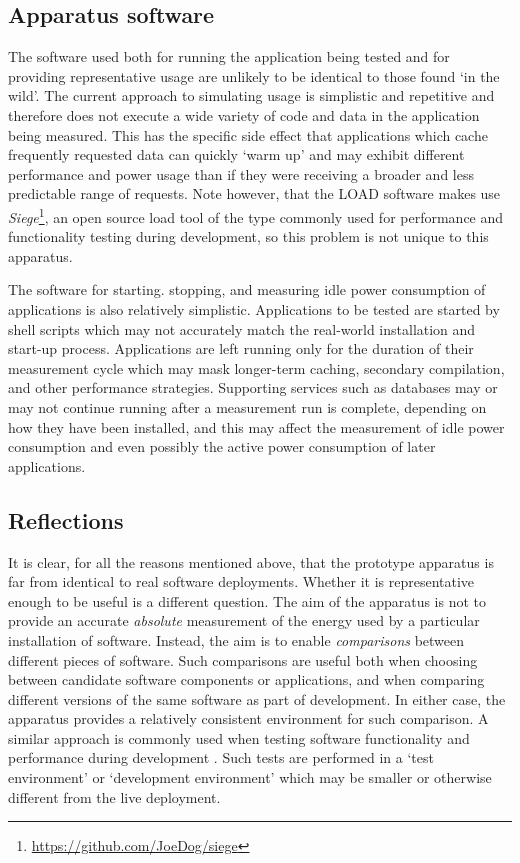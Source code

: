 \subsection{Apparatus software}

The software used both for running the application being tested and for providing representative usage are unlikely to be identical to those found `in the wild'. The current approach to simulating usage is simplistic and repetitive and therefore does not execute a wide variety of code and data in the application being measured. This has the specific side effect that applications which cache frequently requested data can quickly `warm up' and may exhibit different performance and power usage than if they were receiving a broader and less predictable range of requests. Note however, that the LOAD software makes use \emph{Siege}\footnote{\url{https://github.com/JoeDog/siege}}, an open source load tool of the type commonly used for performance and functionality testing during development, so this problem is not unique to this apparatus.

The software for starting. stopping, and measuring idle power consumption of applications is also relatively simplistic. Applications to be tested are started by shell scripts which may not accurately match the real-world installation and start-up process. Applications are left running only for the duration of their measurement cycle which may mask longer-term caching, secondary compilation, and other performance strategies. Supporting services such as databases may or may not continue running after a measurement run is complete, depending on how they have been installed, and this may affect the measurement of idle power consumption and even possibly the active power consumption of later applications.

\subsection{Reflections}

It is clear, for all the reasons mentioned above, that the prototype apparatus is far from identical to real software deployments. Whether it is representative enough to be useful is a different question. The aim of the apparatus is not to provide an accurate \emph{absolute} measurement of the energy used by a particular installation of software. Instead, the aim is to enable \emph{comparisons} between different pieces of software. Such comparisons are useful both when choosing between candidate software components or applications, and when comparing different versions of the same software as part of development. In either case, the apparatus provides a relatively consistent environment for such comparison. A similar approach is commonly used when testing software functionality and performance during development \citep{Collins2012}. Such tests are performed in a `test environment' or `development environment' which may be smaller or otherwise different from the live deployment.

